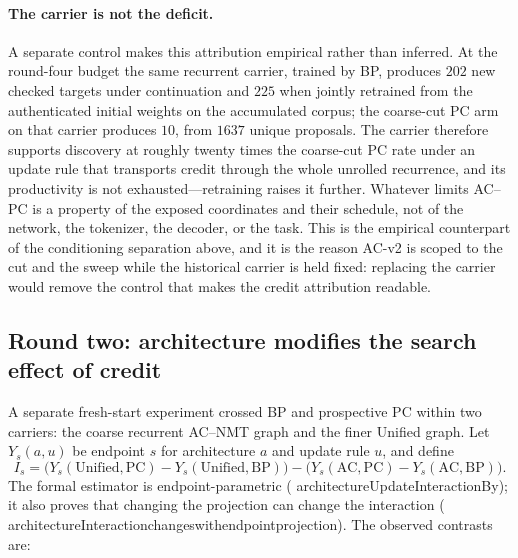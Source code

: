 \documentclass[11pt]{article}
\newcommand{\leanname}[1]{{\scriptsize\ttfamily
  \def\_{\textunderscore\allowbreak}#1}}
\begin{document}
\paragraph{The carrier is not the deficit.}
A separate control makes this attribution empirical rather than inferred. At the round-four
budget the same recurrent carrier, trained by BP, produces $202$ new checked targets under
continuation and $225$ when jointly retrained from the authenticated initial weights on the
accumulated corpus; the coarse-cut PC arm on that carrier produces $10$, from $1637$ unique
proposals. The carrier therefore supports discovery at roughly twenty times the coarse-cut
PC rate under an update rule that transports credit through the whole unrolled recurrence,
and its productivity is not exhausted---retraining raises it further. Whatever limits AC--PC
is a property of the exposed coordinates and their schedule, not of the network, the
tokenizer, the decoder, or the task. This is the empirical counterpart of the conditioning
separation above, and it is the reason AC-v2 is scoped to the cut and the sweep while the
historical carrier is held fixed: replacing the carrier would remove the control that makes
the credit attribution readable.

\subsection{Round two: architecture modifies the search effect of credit}
\label{sec:fresh-round-two-architecture}

A separate fresh-start experiment crossed BP and prospective PC within two carriers:
the coarse recurrent AC--NMT graph and the finer Unified graph. Let
$Y_s(a,u)$ be endpoint $s$ for architecture $a$ and update rule $u$, and define
\[
 I_s =
 \bigl(Y_s(\mathrm{Unified},\mathrm{PC})
       -Y_s(\mathrm{Unified},\mathrm{BP})\bigr)
 -
 \bigl(Y_s(\mathrm{AC},\mathrm{PC})
       -Y_s(\mathrm{AC},\mathrm{BP})\bigr).
\]
The formal estimator is endpoint-parametric
(\leanname{architectureUpdateInteractionBy}); it also proves that changing the
projection can change the interaction
(\leanname{architectureInteraction\_changes\_with\_endpoint\_projection}).
The observed contrasts are:
\end{document}
